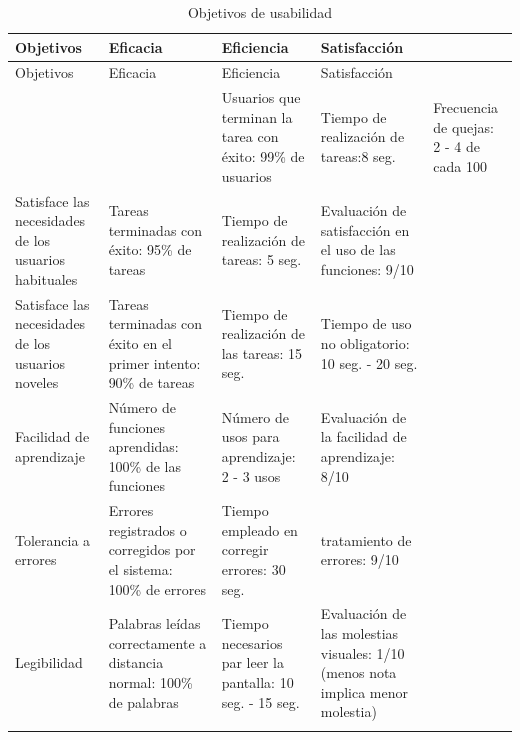 \begin{longtable}[H]{|p{3cm}|p{3cm}|p{3cm}|p{3cm}|}
	\hline
	Objetivos & Eficacia & Eficiencia  & Satisfacción \\
	\hline \hline
	\endfirsthead
	
	\hline
	Objetivos  & Eficacia & Eficiencia  & Satisfacción \\
	\hline \hline
	\endhead
	
	\multicolumn{2}{c}{}
	\endfoot
	
	\endlastfoot
	
			Utilizabilidad global  & Usuarios que terminan la tarea con éxito: 99\% de usuarios  & Tiempo de realización de tareas:8 seg.  & Frecuencia de quejas: 2 - 4 de cada 100 \\ \hline
			
			Satisface las necesidades de los usuarios habituales  & Tareas terminadas con éxito: 95\% de tareas  & Tiempo de realización de tareas: 5 seg. & Evaluación de satisfacción en el uso de las funciones: 9/10\\ \hline
			
			Satisface las necesidades de los usuarios noveles   & Tareas terminadas con éxito en el primer intento: 90\% de tareas  & Tiempo de realización de las tareas: 15 seg. & Tiempo de uso no obligatorio: 10 seg. - 20 seg. \\ \hline
			
			Facilidad de aprendizaje  & Número de funciones aprendidas: 100\% de las funciones  & Número de usos para aprendizaje: 2 - 3 usos  & Evaluación de la facilidad de aprendizaje: 8/10 \\ \hline
			
			Tolerancia a errores  & Errores registrados o corregidos por el sistema: 100\% de errores & Tiempo empleado en corregir errores: 30 seg. & tratamiento de errores: 9/10 \\ \hline
			
			Legibilidad  & Palabras leídas correctamente a distancia normal: 100\% de palabras  & Tiempo necesarios par leer la pantalla: 10 seg. - 15 seg.  & Evaluación de las molestias visuales: 1/10 (menos nota implica menor molestia)  \\ \hline
	
	\caption{Objetivos de usabilidad}
	\label{tabla:objetivosUsabilidad}
\end{longtable}

